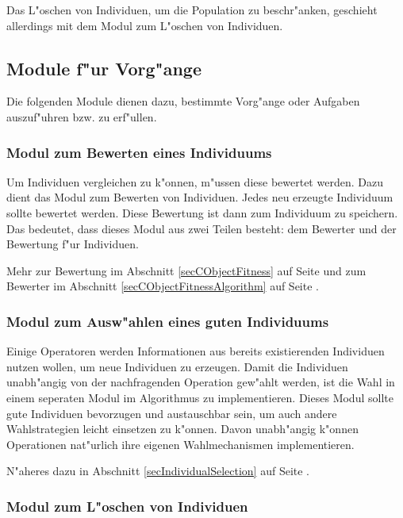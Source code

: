 Das L"oschen von Individuen, um die Population zu beschr"anken, geschieht allerdings mit dem Modul zum L"oschen von Individuen.


\subsection{Module f"ur Vorg"ange}

Die folgenden Module dienen dazu, bestimmte Vorg"ange oder Aufgaben auszuf"uhren bzw. zu erf"ullen.


\subsubsection{Modul zum Bewerten eines Individuums}

Um Individuen vergleichen zu k"onnen, m"ussen diese bewertet werden. Dazu dient das Modul zum Bewerten von Individuen. Jedes neu erzeugte Individuum sollte bewertet werden. Diese Bewertung ist dann zum Individuum zu speichern. Das bedeutet, dass dieses Modul aus zwei Teilen besteht: dem Bewerter und der Bewertung f"ur Individuen.

Mehr zur Bewertung im Abschnitt \ref{secCObjectFitness} auf Seite \pageref{secCObjectFitness} und zum Bewerter im Abschnitt \ref{secCObjectFitnessAlgorithm} auf Seite \pageref{secCObjectFitnessAlgorithm}.


\subsubsection{Modul zum Ausw"ahlen eines guten Individuums}

Einige Operatoren werden Informationen aus bereits existierenden Individuen nutzen wollen, um neue Individuen zu erzeugen. Damit die Individuen unabh"angig von der nachfragenden Operation gew"ahlt werden, ist die Wahl in einem seperaten Modul im Algorithmus zu implementieren. Dieses Modul sollte gute Individuen bevorzugen und austauschbar sein, um auch andere Wahlstrategien leicht einsetzen zu k"onnen. Davon unabh"angig k"onnen Operationen nat"urlich ihre eigenen Wahlmechanismen implementieren.

N"aheres dazu in Abschnitt \ref{secIndividualSelection} auf Seite \pageref{secIndividualSelection}.


\subsubsection{Modul zum L"oschen von Individuen}

